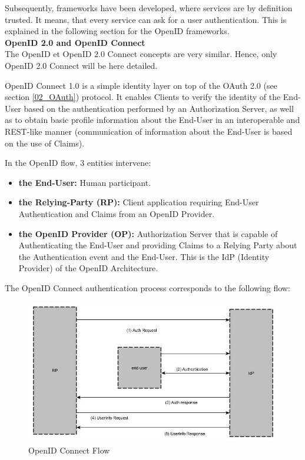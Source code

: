 Subsequently, frameworks have been developed, where services are by definition trusted. It means, that every service can ask for a user authentication. This is explained in the following section for the OpenID frameworks. \\
 
\quad \tabitem \textbf{OpenID 2.0 and OpenID Connect}\\
\label{02_OpenID}
The OpenID et OpenID 2.0 Connect concepts are very similar. Hence, only OpenID 2.0 Connect will be here detailed.

OpenID Connect 1.0 is a simple identity layer on top of the OAuth 2.0 (see section \ref{02_OAuth}) protocol. It enables Clients to verify the identity of the End-User based on the authentication performed by an Authorization Server, as well as to obtain basic profile information about the End-User in an interoperable and REST-like manner\cite{sakimura2014openid} (communication of information about the End-User is based on the use of Claims).

In the OpenID flow, 3 entities intervene: 
\begin{itemize}
	\item \textbf{the End-User:} Human participant.
	\item \textbf{the Relying-Party (RP):} Client application requiring End-User Authentication and Claims from an OpenID Provider.
	\item \textbf{the OpenID Provider (OP):} Authorization Server that is capable of Authenticating the End-User and providing Claims to a Relying Party about the Authentication event and the End-User. This is the IdP (Identity Provider) of the OpenID Architecture.
\end{itemize}


The OpenID Connect authentication process corresponds to the following flow:
\begin{figure}[!ht]
	\centering
	\caption{OpenID Connect Flow}
	\includegraphics[scale=0.6]{images/openID_connect.jpg}
\end{figure}

